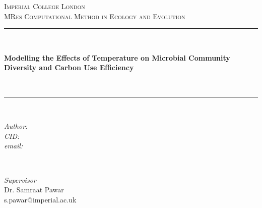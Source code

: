 
\begin{titlepage} %
	\newcommand{\HRule}{\rule{\linewidth}{0.5mm}} %
	
	\center %
	
	
	\textsc{\LARGE Imperial College London}\\[2.5cm] %

	\textsc{\Large MRes Computational Method in Ecology and Evolution}\\[2.5cm] %
	

	
	\HRule\\[0.6cm]
	
	{\huge\bfseries Modelling the Effects of Temperature on Microbial Community Diversity and Carbon Use Efficiency \par}\\[0.4cm] %
	
	\HRule\\[2.5cm]
	
	
	\begin{minipage}{0.4\textwidth}
		\begin{flushleft}
			\large
			\textit{Author: }
			\\
			\textit{CID: }
			\\
			\textit{email: }
		\end{flushleft}
	\end{minipage}
	~
	\begin{minipage}{0.4\textwidth}
		\begin{flushright}
			\large
			\textit{Supervisor}\\
			Dr. Samraat Pawar\\%
			s.pawar@imperial.ac.uk
		\end{flushright}
	\end{minipage}
	

\end{titlepage}
